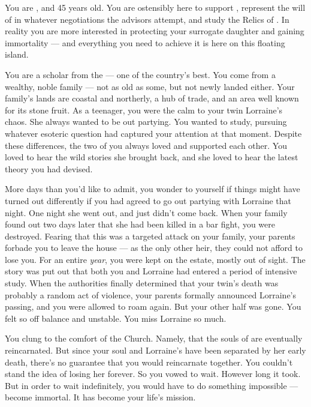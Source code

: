 \documentclass[char]{GL2020}
\begin{document}
\name{\cWildCard{}}

You are \cWildCard{\intro}, and 45 years old. You are ostensibly here to support \cEvil{\intro}, represent the will of \cQueen{\intro} in whatever negotiations the advisors attempt, and study the Relics of \pEarth{}. In reality you are more interested in protecting your surrogate daughter and gaining immortality — and everything you need to achieve it is here on this floating island.

You are a scholar from the \pFarm{} — one of the country’s best. You come from a wealthy, noble family — not as old as some, but not newly landed either. Your family’s lands are coastal and northerly, a hub of trade, and an area well known for its stone fruit. As a teenager, you were the calm to your twin Lorraine’s chaos. She always wanted to be out partying. You wanted to study, pursuing whatever esoteric question had captured your attention at that moment. Despite these differences, the two of you always loved and supported each other. You loved to hear the wild stories she brought back, and she loved to hear the latest theory you had devised.

More days than you’d like to admit, you wonder to yourself if things might have turned out differently if you had agreed to go out partying with Lorraine that night. One night she went out, and just didn’t come back. When your family found out two days later that she had been killed in a bar fight, you were destroyed. Fearing that this was a targeted attack on your family, your parents forbade you to leave the house — as the only other heir, they could not afford to lose you. For an entire \emph{year}, you were kept on the \cWildCard{\formal} estate, mostly out of sight. The story was put out that both you and Lorraine had entered a period of intensive study. When the authorities finally determined that your twin’s death was probably a random act of violence, your parents formally announced Lorraine’s passing, and you were allowed to roam again. But your other half was gone. You felt so off balance and unstable. You miss Lorraine so much.

You clung to the comfort of the Church. Namely, that the souls of \pFarmers{} are eventually reincarnated. But since your soul and Lorraine’s have been separated by her early death, there’s no guarantee that you would reincarnate together. You couldn’t stand the idea of losing her forever. So you vowed to wait. However long it took. But in order to wait indefinitely, you would have to do something impossible — become immortal. It has become your life’s mission.
\end{document}
